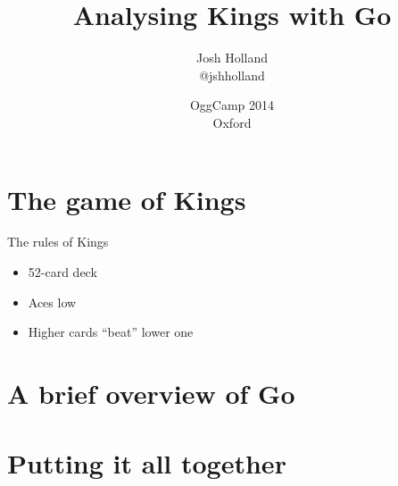 \documentclass{beamer}
\title{Analysing Kings with Go}
\author[@jshholland]{Josh Holland \\ @jshholland}
\date[Oggcamp14]{OggCamp 2014 \\ Oxford}
\begin{document}
\frame{\titlepage}

\frame{\tableofcontents}

\section{The game of Kings}

\begin{frame}{The rules of Kings}
\begin{itemize}
  \item 52-card deck
  \item Aces low
  \item Higher cards “beat” lower one
\end{itemize}
\end{frame}

\section{A brief overview of Go}

\section{Putting it all together}
\end{document}
